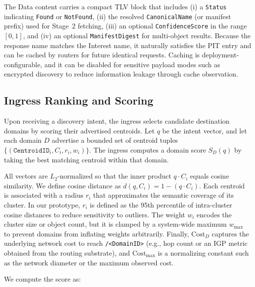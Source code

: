 \documentclass[conference]{IEEEtran}
\begin{document}
The Data content carries a compact TLV block that includes (i) a \texttt{Status} indicating \texttt{Found} or \texttt{NotFound}, (ii) the resolved \texttt{CanonicalName} (or manifest prefix) used for Stage~2 fetching, (iii) an optional \texttt{ConfidenceScore} in the range $[0,1]$, and (iv) an optional \texttt{ManifestDigest} for multi-object results.
Because the response name matches the Interest name, it naturally satisfies the PIT entry and can be cached by routers for future identical requests.
Caching is deployment-configurable, and it can be disabled for sensitive payload modes such as encrypted discovery to reduce information leakage through cache observation.


\subsection{Ingress Ranking and Scoring}
\label{sec:spec_ranking}

Upon receiving a discovery intent, the ingress selects candidate destination domains by scoring their advertised centroids.
Let $q$ be the intent vector, and let each domain $D$ advertise a bounded set of centroid tuples $\{(\texttt{CentroidID}_i, C_i, r_i, w_i)\}$.
The ingress computes a domain score $S_D(q)$ by taking the best matching centroid within that domain.

All vectors are $L_2$-normalized so that the inner product $q \cdot C_i$ equals cosine similarity.
We define cosine distance as $d(q, C_i) = 1 - (q \cdot C_i)$.
Each centroid is associated with a radius $r_i$ that approximates the semantic coverage of its cluster.
In our prototype, $r_i$ is defined as the 95th percentile of intra-cluster cosine distances to reduce sensitivity to outliers.
The weight $w_i$ encodes the cluster size or object count, but it is clamped by a system-wide maximum $w_{\max}$ to prevent domains from inflating weights arbitrarily.
Finally, $\text{Cost}_D$ captures the underlying network cost to reach \texttt{/<DomainID>} (e.g., hop count or an IGP metric obtained from the routing substrate), and $\text{Cost}_{\max}$ is a normalizing constant such as the network diameter or the maximum observed cost.

We compute the score as:
\end{document}

